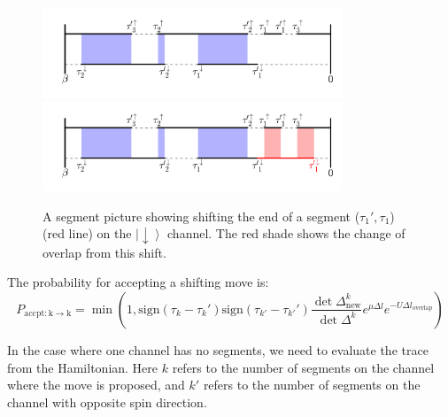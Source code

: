 \begin{figure}[ht]
  \centering
  \includegraphics[width=0.8\textwidth] {img/segment.png}
  \includegraphics[width=0.8\textwidth] {img/segment_shift.png}
  \caption{A segment picture showing shifting the end of a segment ($\tau_1',\tau_1$)
(red line) on the $\left|\downarrow\right\rangle$ channel. The red shade shows the
change of overlap from this shift.
}

\label{fig:seg_shift}
\end{figure}

The probability for accepting a shifting move is:
\begin{equation}
P_\mathrm{accpt:k\rightarrow k}=\min\left(1,
  \mathrm{sign}(\tau_k-\tau_k')\mathrm{sign}(\tau_{k'}-\tau_{k'}')
  \frac{\det\Delta^{k}_{\mathrm{new}}}{\det\Delta^{k}}
  e^{\mu\Delta l}e^{-U \Delta l_\mathrm{overlap}}
\right)
\end{equation}

In the case where one channel has no segments, we need to evaluate the trace
from the Hamiltonian. Here $k$ refers to the number of segments on the channel
where the move is proposed, and $k'$ refers to the number of segments on the
channel with opposite spin direction.

